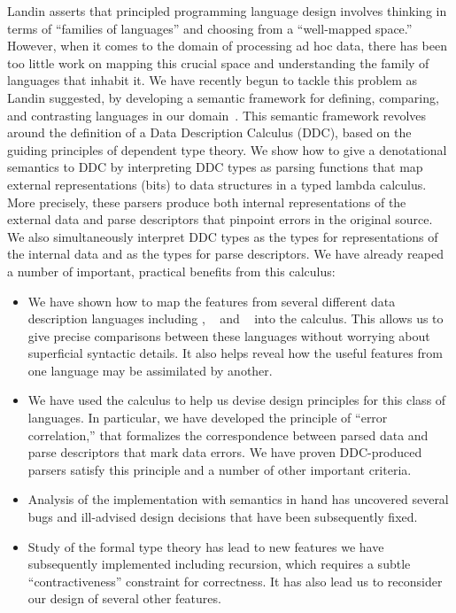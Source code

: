 Landin asserts that principled programming language design involves
thinking in terms of ``families of languages'' and choosing from a
``well-mapped space.''  However, when it comes to the domain of
processing ad hoc data, there has been too little work on mapping this
crucial space and understanding the family of languages that
inhabit it.  We have recently begun to tackle this problem
as Landin suggested, by developing a semantic
framework for defining, comparing, and contrasting languages
in our domain~\cite{fisher+:700}.  This semantic framework revolves around the
definition of a Data Description Calculus (DDC),
based on the guiding principles of dependent type theory.  
We show how to give a denotational semantics
to DDC by interpreting DDC
types as parsing functions that map external representations (bits)
to data structures in a typed lambda calculus.  More precisely,
these parsers produce both 
internal representations of the external data and
parse descriptors that pinpoint errors in the original source.
We also simultaneously interpret DDC types as the types for
representations of the internal data and as the types for parse descriptors.
We have already reaped a number of important, practical benefits from this calculus:
\begin{itemize}
\item We have shown how to map the features from several different data description languages including \pads, \packettypes{}~\cite{sigcomm00} and
\datascript{}~\cite{gpce02} into the calculus.  This allows us to give
precise comparisons between these languages without worrying about
superficial syntactic details.  It also helps reveal how the useful features
from one language may be assimilated by another.
\item We have used the calculus to help us devise design
principles for this class of languages.  In particular, we
have developed the principle of ``error correlation,'' that formalizes
the correspondence between parsed data and parse descriptors that mark
data errors.  We have proven DDC-produced parsers satisfy this principle
and a number of other important criteria.
\item Analysis of the \pads{} implementation with semantics in hand
has uncovered several bugs and ill-advised design decisions
that have been subsequently fixed.
\item Study of the formal type theory has lead to new features we have 
subsequently implemented including recursion, which requires a subtle 
``contractiveness'' constraint for correctness.  It has also lead us
to reconsider our design of several other features.
\end{itemize}


